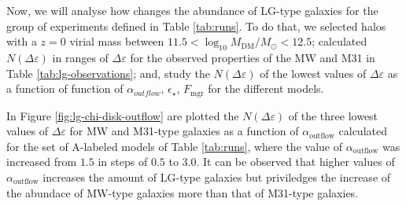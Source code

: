 \documentclass[usenatbib]{mn2e}
\begin{document}
Now, we will analyse how changes the abundance of LG-type galaxies for the group of experiments defined in Table \ref{tab:runs}. To do that, 
we selected halos with a $z=0$ virial mass between  $11.5<\log_{10} M_{\text{DM}}/M_{\odot}<12.5$; calculated $N(\Delta\varepsilon)$ in ranges 
of $\Delta\varepsilon$ for the observed properties of the MW and M31 in Table \ref{tab:lg-observations}; and, study the $N(\Delta\varepsilon)$
 of the lowest values of $\Delta\varepsilon$ as a function of function of $\alpha_{outflow}$, $\epsilon_{\star}$, $F_{\text{mgr}}$ for the different models.

In Figure \ref{fig:lg-chi-disk-outflow} are plotted the $N(\Delta\varepsilon)$ of the three lowest values of $\Delta\varepsilon$
for MW and M31-type galaxies as a function of $\alpha_{\text{outflow}}$ calculated  for the set of A-labeled models of Table  \ref{tab:runs}, where the 
value of $\alpha_{\text{outflow}}$ was increased from $1.5$ in steps of $0.5$  to $3.0$.  It can be observed that higher values of $\alpha_{\text{outflow}}$ 
increases the amount of LG-type galaxies but priviledges the increase of the abundace of MW-type galaxies more than that of M31-type galaxies. 
\end{document}
